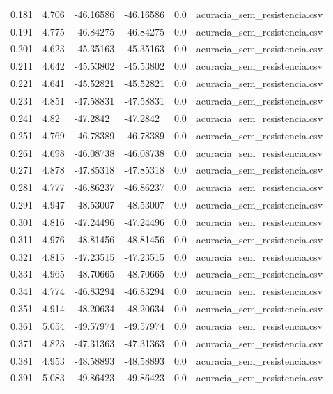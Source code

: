 \begin{table}
\begin{tabular}{llllll}
0.181 & 4.706 & -46.16586 & -46.16586 & 0.0 & acuracia\_sem\_resistencia.csv \\
0.191 & 4.775 & -46.84275 & -46.84275 & 0.0 & acuracia\_sem\_resistencia.csv \\
0.201 & 4.623 & -45.35163 & -45.35163 & 0.0 & acuracia\_sem\_resistencia.csv \\
0.211 & 4.642 & -45.53802 & -45.53802 & 0.0 & acuracia\_sem\_resistencia.csv \\
0.221 & 4.641 & -45.52821 & -45.52821 & 0.0 & acuracia\_sem\_resistencia.csv \\
0.231 & 4.851 & -47.58831 & -47.58831 & 0.0 & acuracia\_sem\_resistencia.csv \\
0.241 & 4.82 & -47.2842 & -47.2842 & 0.0 & acuracia\_sem\_resistencia.csv \\
0.251 & 4.769 & -46.78389 & -46.78389 & 0.0 & acuracia\_sem\_resistencia.csv \\
0.261 & 4.698 & -46.08738 & -46.08738 & 0.0 & acuracia\_sem\_resistencia.csv \\
0.271 & 4.878 & -47.85318 & -47.85318 & 0.0 & acuracia\_sem\_resistencia.csv \\
0.281 & 4.777 & -46.86237 & -46.86237 & 0.0 & acuracia\_sem\_resistencia.csv \\
0.291 & 4.947 & -48.53007 & -48.53007 & 0.0 & acuracia\_sem\_resistencia.csv \\
0.301 & 4.816 & -47.24496 & -47.24496 & 0.0 & acuracia\_sem\_resistencia.csv \\
0.311 & 4.976 & -48.81456 & -48.81456 & 0.0 & acuracia\_sem\_resistencia.csv \\
0.321 & 4.815 & -47.23515 & -47.23515 & 0.0 & acuracia\_sem\_resistencia.csv \\
0.331 & 4.965 & -48.70665 & -48.70665 & 0.0 & acuracia\_sem\_resistencia.csv \\
0.341 & 4.774 & -46.83294 & -46.83294 & 0.0 & acuracia\_sem\_resistencia.csv \\
0.351 & 4.914 & -48.20634 & -48.20634 & 0.0 & acuracia\_sem\_resistencia.csv \\
0.361 & 5.054 & -49.57974 & -49.57974 & 0.0 & acuracia\_sem\_resistencia.csv \\
0.371 & 4.823 & -47.31363 & -47.31363 & 0.0 & acuracia\_sem\_resistencia.csv \\
0.381 & 4.953 & -48.58893 & -48.58893 & 0.0 & acuracia\_sem\_resistencia.csv \\
0.391 & 5.083 & -49.86423 & -49.86423 & 0.0 & acuracia\_sem\_resistencia.csv \\

\end{tabular}
\end{table}
